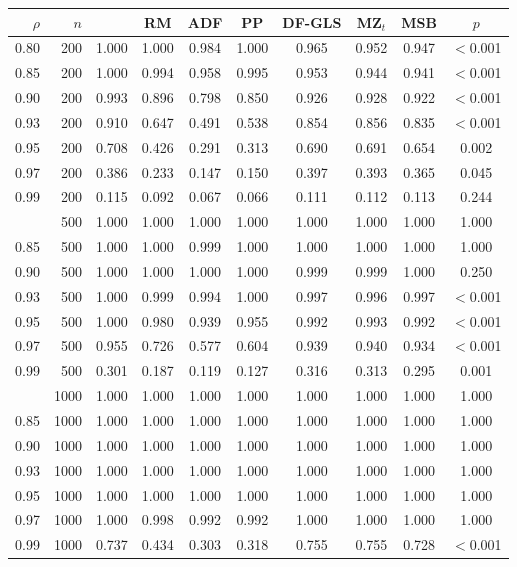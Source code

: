 \begin{tabular}{rrcccccccc}
\toprule
$\rho$ & $n$ & \RMGLS{} & RM & ADF & PP & DF-GLS & MZ$_t$ & MSB & $p$ \\
\midrule
0.80 & 200 & 1.000 & 1.000 & 0.984 & 1.000 & 0.965 & 0.952 & 0.947 & $<$0.001 \\
0.85 & 200 & 1.000 & 0.994 & 0.958 & 0.995 & 0.953 & 0.944 & 0.941 & $<$0.001 \\
0.90 & 200 & 0.993 & 0.896 & 0.798 & 0.850 & 0.926 & 0.928 & 0.922 & $<$0.001 \\
0.93 & 200 & 0.910 & 0.647 & 0.491 & 0.538 & 0.854 & 0.856 & 0.835 & $<$0.001 \\
0.95 & 200 & 0.708 & 0.426 & 0.291 & 0.313 & 0.690 & 0.691 & 0.654 & 0.002 \\
0.97 & 200 & 0.386 & 0.233 & 0.147 & 0.150 & 0.397 & 0.393 & 0.365 & 0.045 \\
0.99 & 200 & 0.115 & 0.092 & 0.067 & 0.066 & 0.111 & 0.112 & 0.113 & 0.244 \\
\addlinespace
0.80 & 500 & 1.000 & 1.000 & 1.000 & 1.000 & 1.000 & 1.000 & 1.000 & 1.000 \\
0.85 & 500 & 1.000 & 1.000 & 0.999 & 1.000 & 1.000 & 1.000 & 1.000 & 1.000 \\
0.90 & 500 & 1.000 & 1.000 & 1.000 & 1.000 & 0.999 & 0.999 & 1.000 & 0.250 \\
0.93 & 500 & 1.000 & 0.999 & 0.994 & 1.000 & 0.997 & 0.996 & 0.997 & $<$0.001 \\
0.95 & 500 & 1.000 & 0.980 & 0.939 & 0.955 & 0.992 & 0.993 & 0.992 & $<$0.001 \\
0.97 & 500 & 0.955 & 0.726 & 0.577 & 0.604 & 0.939 & 0.940 & 0.934 & $<$0.001 \\
0.99 & 500 & 0.301 & 0.187 & 0.119 & 0.127 & 0.316 & 0.313 & 0.295 & 0.001 \\
\addlinespace
0.80 & 1000 & 1.000 & 1.000 & 1.000 & 1.000 & 1.000 & 1.000 & 1.000 & 1.000 \\
0.85 & 1000 & 1.000 & 1.000 & 1.000 & 1.000 & 1.000 & 1.000 & 1.000 & 1.000 \\
0.90 & 1000 & 1.000 & 1.000 & 1.000 & 1.000 & 1.000 & 1.000 & 1.000 & 1.000 \\
0.93 & 1000 & 1.000 & 1.000 & 1.000 & 1.000 & 1.000 & 1.000 & 1.000 & 1.000 \\
0.95 & 1000 & 1.000 & 1.000 & 1.000 & 1.000 & 1.000 & 1.000 & 1.000 & 1.000 \\
0.97 & 1000 & 1.000 & 0.998 & 0.992 & 0.992 & 1.000 & 1.000 & 1.000 & 1.000 \\
0.99 & 1000 & 0.737 & 0.434 & 0.303 & 0.318 & 0.755 & 0.755 & 0.728 & $<$0.001 \\
\bottomrule
\end{tabular}
